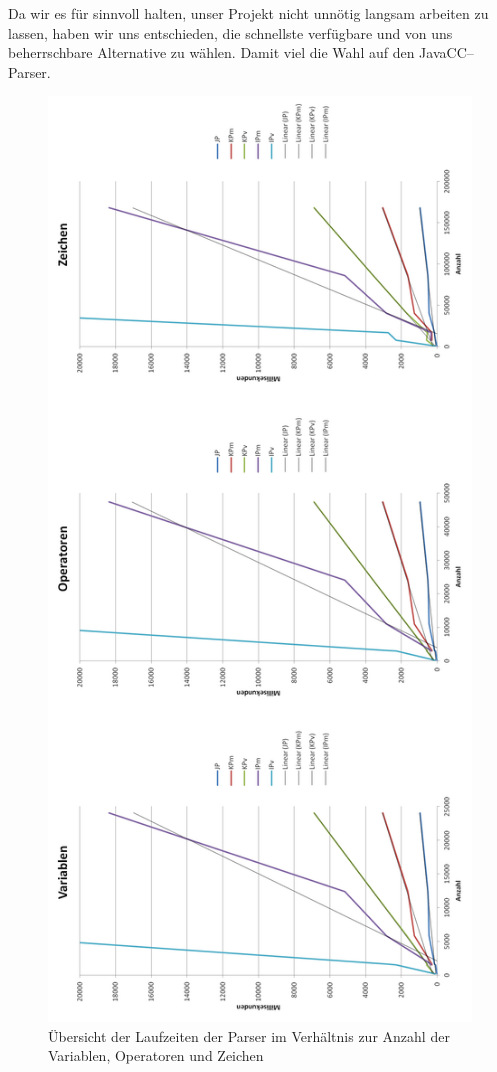 \documentclass[ngerman,a4paper,abstracton,open=right,twoside=false,toc=listofnumbered,bibtotocnumbered]{scrreprt}
\begin{document}
Da wir es für sinnvoll halten, unser Projekt nicht unnötig langsam arbeiten zu lassen, haben wir uns entschieden, die schnellste verfügbare und von uns beherrschbare Alternative zu wählen. Damit viel die Wahl auf den JavaCC--Parser.

\begin{figure}[ht]
	\begin{center}
		\includegraphics[scale=0.5]{img/zeiten}
	\end{center}
	\caption{\label{parse-zeiten}Übersicht der Laufzeiten der Parser im Verhältnis zur Anzahl der Variablen, Operatoren und Zeichen}
\end{figure}
\end{document}
